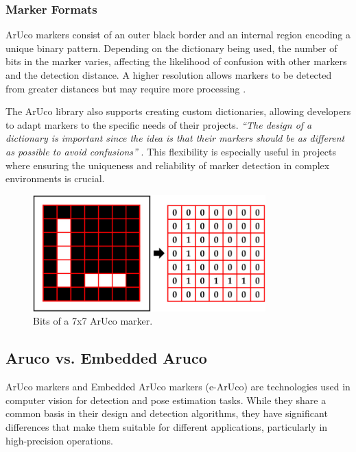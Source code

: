     \subsubsection{Marker Formats}

    ArUco markers consist of an outer black border and an internal region encoding a unique binary pattern. Depending on the dictionary being used, the number of bits in the marker varies, affecting the likelihood of confusion with other markers and the detection distance. A higher resolution allows markers to be detected from greater distances but may require more processing \cite{aruco_docs}.

    The ArUco library also supports creating custom dictionaries, allowing developers to adapt markers to the specific needs of their projects. \textit{“The design of a dictionary is important since the idea is that their markers should be as different as possible to avoid confusions”} \cite{aruco_docs_pdf}. This flexibility is especially useful in projects where ensuring the uniqueness and reliability of marker detection in complex environments is crucial.

    \begin{figure}[H] 
    \centering 
    \includegraphics[width=0.8\textwidth]{pictures/bits_aruco.png} %
    \caption{Bits of a 7x7 ArUco marker.} 
    \label{fig} 
    \end{figure}

\subsection{Aruco vs. Embedded Aruco}

    ArUco markers and Embedded ArUco markers (e-ArUco) are technologies used in computer vision for detection and pose estimation tasks. While they share a common basis in their design and detection algorithms, they have significant differences that make them suitable for different applications, particularly in high-precision operations.

